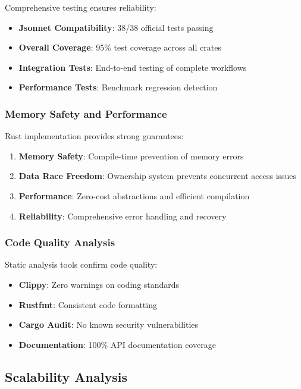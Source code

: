 \documentclass[11pt,a4paper]{article}
\begin{document}
Comprehensive testing ensures reliability:

\begin{itemize}
\item \textbf{Jsonnet Compatibility}: 38/38 official tests passing
\item \textbf{Overall Coverage}: 95\% test coverage across all crates
\item \textbf{Integration Tests}: End-to-end testing of complete workflows
\item \textbf{Performance Tests}: Benchmark regression detection
\end{itemize}

\subsubsection{Memory Safety and Performance}
\label{subsubsec:memory_safety}

Rust implementation provides strong guarantees:

\begin{enumerate}
\item \textbf{Memory Safety}: Compile-time prevention of memory errors
\item \textbf{Data Race Freedom}: Ownership system prevents concurrent access issues
\item \textbf{Performance}: Zero-cost abstractions and efficient compilation
\item \textbf{Reliability}: Comprehensive error handling and recovery
\end{enumerate}

\subsubsection{Code Quality Analysis}
\label{subsubsec:code_quality}

Static analysis tools confirm code quality:

\begin{itemize}
\item \textbf{Clippy}: Zero warnings on coding standards
\item \textbf{Rustfmt}: Consistent code formatting
\item \textbf{Cargo Audit}: No known security vulnerabilities
\item \textbf{Documentation}: 100\% API documentation coverage
\end{itemize}

\subsection{Scalability Analysis}
\label{subsec:scalability}
\end{document}
